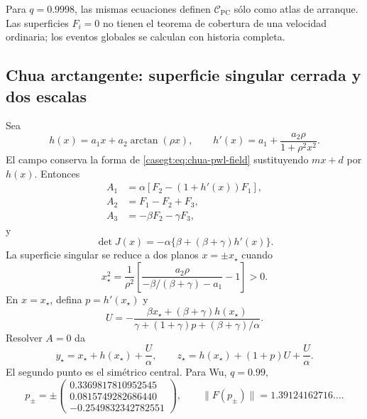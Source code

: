 Para $q=0.9998$, las mismas ecuaciones definen
$\mathcal C_{\mathrm{PC}}$ sólo como atlas de arranque. Las superficies
$F_i=0$ no tienen el teorema de cobertura de una velocidad ordinaria; los
eventos globales se calculan con historia completa.

\subsection{Chua arctangente: superficie singular cerrada y dos escalas}
\label{subsec:casegt-chua-arctan}

Sea
\begin{equation}
 h(x)=a_1x+a_2\arctan(\rho x),
 \qquad
 h'(x)=a_1+\frac{a_2\rho}{1+\rho^2x^2}.
 \label{casegt:eq:arctan-h}
\end{equation}
El campo conserva la forma de \eqref{casegt:eq:chua-pwl-field} sustituyendo
$mx+d$ por $h(x)$. Entonces
\begin{align}
 A_1&=\alpha[F_2-(1+h'(x))F_1],\nonumber\\
 A_2&=F_1-F_2+F_3,\\
 A_3&=-\beta F_2-\gamma F_3,
 \label{casegt:eq:arctan-A}
\end{align}
y
\begin{equation}
 \det J(x)=-\alpha\{\beta+(\beta+\gamma)h'(x)\}.
 \label{casegt:eq:arctan-det}
\end{equation}
La superficie singular se reduce a dos planos $x=\pm x_\star$ cuando
\begin{equation}
 x_\star^2=\frac{1}{\rho^2}
 \left[
 \frac{a_2\rho}{-\beta/(\beta+\gamma)-a_1}-1
 \right]>0.
 \label{casegt:eq:arctan-xstar}
\end{equation}
En $x=x_\star$, defina $p=h'(x_\star)$ y
\begin{equation}
 U=-\frac{\beta x_\star+(\beta+\gamma)h(x_\star)}
 {\gamma+(1+\gamma)p+(\beta+\gamma)/\alpha}.
 \label{casegt:eq:arctan-U}
\end{equation}
Resolver $A=0$ da
\begin{equation}
 y_\star=x_\star+h(x_\star)+\frac{U}{\alpha},
 \qquad
 z_\star=h(x_\star)+(1+p)U+\frac{U}{\alpha}.
 \label{casegt:eq:arctan-yz}
\end{equation}
El segundo punto es el simétrico central. Para Wu, $q=0.99$,
\begin{equation}
 p_\pm=\pm
 \begin{pmatrix}
 0.3369817810952545\\
 0.0815749282686440\\
 -0.2549832342782551
 \end{pmatrix},
 \qquad \lVert F(p_\pm)\rVert=1.39124162716\ldots.
 \label{casegt:eq:wu-pp}
\end{equation}
